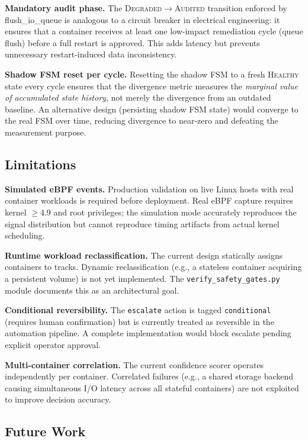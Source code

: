 \documentclass[runningheads]{llncs}
\begin{document}
\noindent\textbf{Mandatory audit phase.}  The \textsc{Degraded}$\to$\textsc{Audited}
transition enforced by flush\_io\_queue is analogous to a circuit
breaker in electrical engineering: it ensures that a container receives
at least one low-impact remediation cycle (queue flush) before a
full restart is approved.  This adds latency but prevents unnecessary
restart-induced data inconsistency.

\noindent\textbf{Shadow FSM reset per cycle.}  Resetting the shadow FSM
to a fresh \textsc{Healthy} state every cycle ensures that the
divergence metric measures the \emph{marginal value of accumulated
state history}, not merely the divergence from an outdated baseline.
An alternative design (persisting shadow FSM state) would converge
to the real FSM over time, reducing divergence to near-zero and
defeating the measurement purpose.

\subsection{Limitations}

\noindent\textbf{Simulated eBPF events.}  Production validation on live
Linux hosts with real container workloads is required before deployment.
Real eBPF capture requires kernel $\geq$4.9 and root privileges; the
simulation mode accurately reproduces the signal distribution but
cannot reproduce timing artifacts from actual kernel scheduling.

\noindent\textbf{Runtime workload reclassification.}  The current design
statically assigns containers to tracks.  Dynamic reclassification
(e.g., a stateless container acquiring a persistent volume) is not
yet implemented.  The \texttt{verify\_safety\_gates.py} module
documents this as an architectural goal.

\noindent\textbf{Conditional reversibility.}  The \texttt{escalate} action
is tagged \texttt{conditional} (requires human confirmation) but is
currently treated as reversible in the automation pipeline.  A complete
implementation would block escalate pending explicit operator approval.

\noindent\textbf{Multi-container correlation.}  The current confidence
scorer operates independently per container.  Correlated failures
(e.g., a shared storage backend causing simultaneous I/O latency across
all stateful containers) are not exploited to improve decision accuracy.

\subsection{Future Work}
\end{document}
